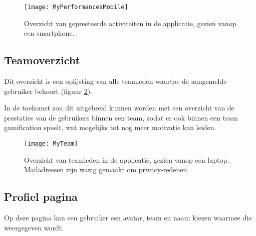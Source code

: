 \begin{figure}[h]
    \caption[Overzicht activiteiten website smartphone]{Overzicht van gepresteerde activiteiten in de applicatie, gezien vanop een smartphone.}
    \texttt{[image: MyPerformancesMobile]}
    \label{fig:performancesMobile}
\end{figure}

\subsection{Teamoverzicht}

Dit overzicht is een oplijsting van alle teamleden waartoe de aangemelde gebruiker behoort (figuur \ref{fig:team}).

In de toekomst zou dit uitgebreid kunnen worden met een overzicht van de prestaties van de gebruikers binnen een team, zodat er ook binnen een team gamification speelt, wat mogelijks tot nog meer motivatie kan leiden.

\begin{figure}[h]
    \caption[Overzicht van teamleden]{Overzicht van teamleden in de applicatie, gezien vanop een laptop. Mailadressen zijn wazig gemaakt om privacy-redenen.}
    \texttt{[image: MyTeam]}
    \label{fig:team}
\end{figure}

\subsection{Profiel pagina}

Op deze pagina kan een gebruiker een avatar, team en naam kiezen waarmee die weergegeven wordt.